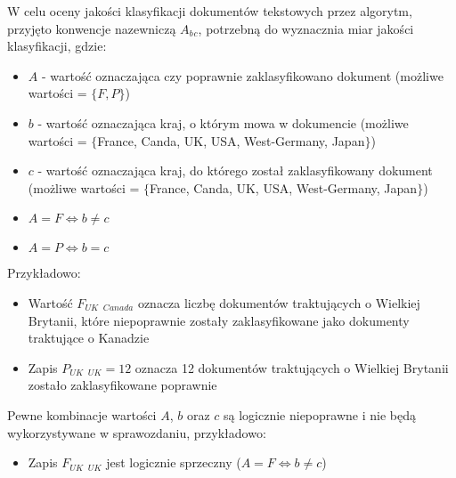 \documentclass{classrep}
\begin{document}
W celu oceny jakości klasyfikacji dokumentów tekstowych \cite{teksty} przez algorytm, przyjęto konwencje nazewniczą $A_b$$_c$, potrzebną do wyznacznia miar jakości klasyfikacji, gdzie:
\begin{itemize}
\item $A$ - wartość oznaczająca czy poprawnie zaklasyfikowano dokument (możliwe wartości = $\{F, P\}$)
\item $b$ - wartość oznaczająca kraj, o którym mowa w dokumencie (możliwe wartości = $\{$France, Canda, UK, USA, West-Germany, Japan$\}$)
\item $c$ - wartość oznaczająca kraj, do którego został zaklasyfikowany dokument (możliwe wartości = $\{$France, Canda, UK, USA, West-Germany, Japan$\}$)
\item $A=F \iff b \neq c$
\item $A=P \iff b = c$
\end{itemize} \hfill \break
Przykładowo:
\begin{itemize}
\item Wartość $F_{UK}$ $_{Canada}$ oznacza liczbę dokumentów traktujących o Wielkiej Brytanii, które niepoprawnie zostały zaklasyfikowane jako dokumenty traktujące o Kanadzie
\item Zapis $P_{UK}$ $_{UK} = 12$ oznacza 12 dokumentów traktujących o Wielkiej Brytanii zostało zaklasyfikowane poprawnie 
\end{itemize} \hfill \break
Pewne kombinacje wartości $A$, $b$ oraz $c$ są logicznie niepoprawne i nie będą wykorzystywane w sprawozdaniu, przykładowo:
\begin{itemize}
\item Zapis $F_{UK}$ $_{UK}$ jest logicznie sprzeczny ($A=F \iff b \neq c$)
\end{itemize} \hfill \break
\end{document}
